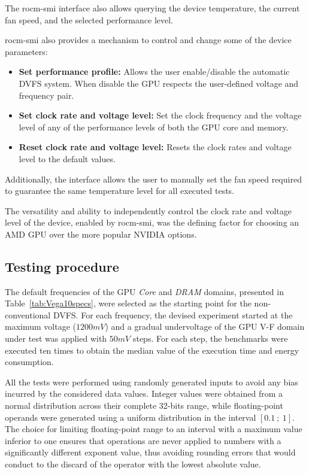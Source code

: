 The rocm-smi interface also allows querying the device temperature, the current fan speed, and the selected performance level.

rocm-smi also provides a mechanism to control and change some of the device parameters:
\begin{itemize}
\item \textbf{Set performance profile:} Allows the user enable/disable the automatic DVFS system. When disable the GPU respects the user-defined voltage and frequency pair.
\item \textbf{Set clock rate and voltage level:} Set the clock frequency and the voltage level of any of the performance levels of both the GPU core and memory. 
\item \textbf{Reset clock rate and voltage level:} Resets the clock rates and voltage level to the default values.
\end{itemize}

Additionally, the interface allows the user to manually set the fan speed required to guarantee the same temperature level for all executed tests.

The versatility and ability to independently control the clock rate and voltage level of the device, enabled by rocm-smi, was the defining factor for choosing an AMD GPU over the more popular NVIDIA options.


\subsection{Testing procedure}

The default frequencies of the GPU \textit{Core} and \textit{DRAM} domains, presented in Table~\ref{tab:Vega10specs}, were selected as the starting point for the non-conventional DVFS. For each frequency, the devised experiment started at the maximum voltage ($1200mV$) and a gradual undervoltage of the GPU V-F domain under test was applied with $50mV$ steps. For each step, the benchmarks were executed ten times to obtain the median value of the execution time and energy consumption. 

All the tests were performed using randomly generated inputs to avoid any bias incurred by the considered data values. Integer values were obtained from a normal distribution across their complete 32-bits range, while floating-point operands were generated using a uniform distribution in the interval $[0.1~;~1]$. The choice for limiting floating-point range to an interval with a maximum value inferior to one ensures that operations are never applied to numbers with a significantly different exponent value, thus avoiding rounding errors that would conduct to the discard of the operator with the lowest absolute value.

